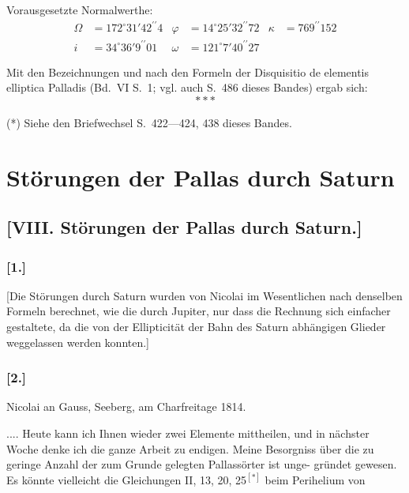 \documentclass[10pt,a4paper]{article}
\begin{document}
Vorausgesetzte Normalwerthe:
\begin{align*}
\Omega &= 172^{\circ}31'42^{\prime\prime}4 & \varphi &= 14^{\circ}25'32^{\prime\prime}72 & \kappa &= 769^{\prime\prime}152 \\
i &= 34^{\circ}36' 9^{\prime\prime}01 & \omega &= 121^{\circ} 7'40^{\prime\prime}27
\end{align*}

Mit den Bezeichnungen und nach den Formeln der Disquisitio de elementis elliptica Palladis (Bd.~VI 
S.~1; vgl. auch S.~486 dieses Bandes) ergab sich:
\[\ast\ast\ast\]

(*) Siehe den Briefwechsel S.~422---424, 438 dieses Bandes.

\newpage
\section*{Störungen der Pallas durch Saturn}

\subsection*{[VIII. Störungen der Pallas durch Saturn.]}

\subsubsection*{[1.]}

[Die Störungen durch Saturn wurden von Nicolai im Wesentlichen 
nach denselben Formeln berechnet, wie die durch Jupiter, nur dass die Rechnung 
sich einfacher gestaltete, da die von der Ellipticität der Bahn des Saturn 
abhängigen Glieder weggelassen werden konnten.]

\subsubsection*{[2.]}

Nicolai an Gauss, Seeberg, am Charfreitage 1814.

.... Heute kann ich Ihnen wieder zwei Elemente mittheilen, und in 
nächster Woche denke ich die ganze Arbeit zu endigen. Meine Besorgniss 
über die zu geringe Anzahl der zum Grunde gelegten Pallassörter ist unge-
gründet gewesen. Es könnte vielleicht die Gleichungen II, 13, 20, 25$^{[*]}$ beim Perihelium von 
\end{document}
